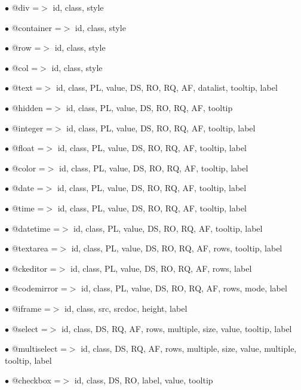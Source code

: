 \documentclass[a4paper]{book}
\begin{document}
\begin{compactitem}
\item[\color{myblue}$\bullet$] @div         =$>$ id, class, style
\item[\color{myblue}$\bullet$] @container   =$>$ id, class, style
\item[\color{myblue}$\bullet$] @row         =$>$ id, class, style
\item[\color{myblue}$\bullet$] @col         =$>$ id, class, style
\item[\color{myblue}$\bullet$] @text        =$>$ id, class, PL, value, DS, RO, RQ, AF, datalist, tooltip, label
\item[\color{myblue}$\bullet$] @hidden      =$>$ id, class, PL, value, DS, RO, RQ, AF, tooltip
\item[\color{myblue}$\bullet$] @integer     =$>$ id, class, PL, value, DS, RO, RQ, AF, tooltip, label
\item[\color{myblue}$\bullet$] @float       =$>$ id, class, PL, value, DS, RO, RQ, AF, tooltip, label
\item[\color{myblue}$\bullet$] @color       =$>$ id, class, PL, value, DS, RO, RQ, AF, tooltip, label
\item[\color{myblue}$\bullet$] @date        =$>$ id, class, PL, value, DS, RO, RQ, AF, tooltip, label
\item[\color{myblue}$\bullet$] @time        =$>$ id, class, PL, value, DS, RO, RQ, AF, tooltip, label
\item[\color{myblue}$\bullet$] @datetime    =$>$ id, class, PL, value, DS, RO, RQ, AF, tooltip, label
\item[\color{myblue}$\bullet$] @textarea    =$>$ id, class, PL, value, DS, RO, RQ, AF, rows, tooltip, label
\item[\color{myblue}$\bullet$] @ckeditor    =$>$ id, class, PL, value, DS, RO, RQ, AF, rows, label
\item[\color{myblue}$\bullet$] @codemirror  =$>$ id, class, PL, value, DS, RO, RQ, AF, rows, mode, label
\item[\color{myblue}$\bullet$] @iframe      =$>$ id, class, src, srcdoc, height, label
\item[\color{myblue}$\bullet$] @select      =$>$ id, class, DS, RQ, AF, rows, multiple, size, value, tooltip, label
\item[\color{myblue}$\bullet$] @multiselect =$>$ id, class, DS, RQ, AF, rows, multiple, size, value, multiple, tooltip, label
\item[\color{myblue}$\bullet$] @checkbox    =$>$ id, class, DS, RO, label, value, tooltip

\end{compactitem}
\end{document}

